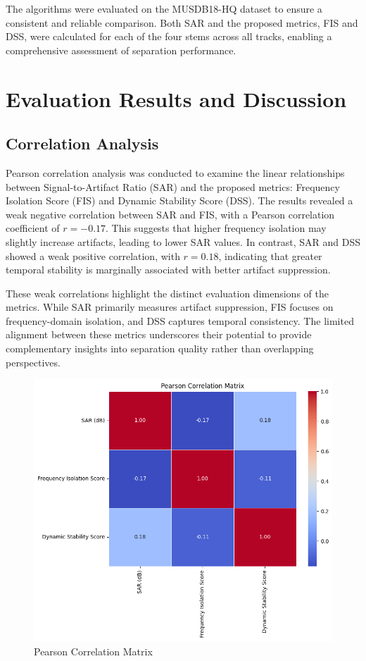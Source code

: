 \documentclass[10pt,twocolumn]{article}
\begin{document}
The algorithms were evaluated on the MUSDB18-HQ dataset to ensure a consistent and reliable comparison. Both SAR and the proposed metrics, FIS and DSS, were calculated for each of the four stems across all tracks, enabling a comprehensive assessment of separation performance.

\section{Evaluation Results and Discussion}

\subsection{Correlation Analysis}
Pearson correlation analysis was conducted to examine the linear relationships between Signal-to-Artifact Ratio (SAR) and the proposed metrics: Frequency Isolation Score (FIS) and Dynamic Stability Score (DSS). The results revealed a weak negative correlation between SAR and FIS, with a Pearson correlation coefficient of $r = -0.17$. This suggests that higher frequency isolation may slightly increase artifacts, leading to lower SAR values. In contrast, SAR and DSS showed a weak positive correlation, with $r = 0.18$, indicating that greater temporal stability is marginally associated with better artifact suppression.

These weak correlations highlight the distinct evaluation dimensions of the metrics. While SAR primarily measures artifact suppression, FIS focuses on frequency-domain isolation, and DSS captures temporal consistency. The limited alignment between these metrics underscores their potential to provide complementary insights into separation quality rather than overlapping perspectives.
\begin{figure}
    \centering
    \includegraphics[width=.95\linewidth]{results graph/Pearson Correlation Matrix.png}
    \caption{
        Pearson Correlation Matrix
    }
    \label{fig:first-page}
\end{figure}
\end{document}
